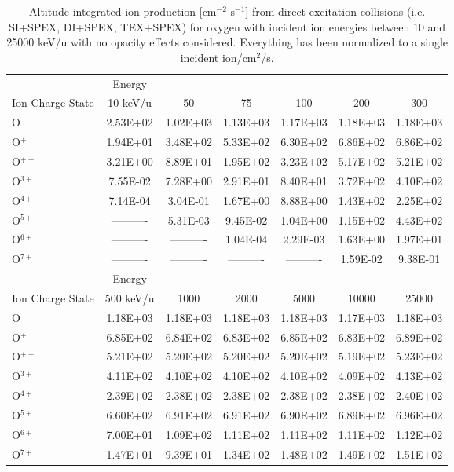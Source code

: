 \begin{table}[ht]
    \centering
    \caption{Altitude integrated ion production [cm$^{-2}$ s$^{-1}$] from direct excitation collisions (i.e. SI+SPEX, DI+SPEX, TEX+SPEX) for oxygen with incident ion energies between 10 and 25000 keV/u with no opacity effects considered. Everything has been normalized to a single incident ion/cm$^2$/s.}
    \begin{tabular}{l|c|c|c|c|c|c}
    \hline
    & Energy & & & & & \\
    Ion Charge State & 10 keV/u & 50 & 75 & 100 & 200 & 300 \\
    \hline
    O & 2.53E+02 & 1.02E+03 & 1.13E+03 & 1.17E+03 & 1.18E+03 & 1.18E+03 \\
    O$^+$ & 1.94E+01 & 3.48E+02 & 5.33E+02 & 6.30E+02 & 6.86E+02 & 6.86E+02 \\
    O$^{++}$ & 3.21E+00 & 8.89E+01 & 1.95E+02 & 3.23E+02 & 5.17E+02 & 5.21E+02 \\
    O$^{3+}$ & 7.55E-02 & 7.28E+00 & 2.91E+01 & 8.40E+01 & 3.72E+02 & 4.10E+02 \\
    O$^{4+}$ & 7.14E-04 & 3.04E-01 & 1.67E+00 & 8.88E+00 & 1.43E+02 & 2.25E+02 \\
    O$^{5+}$ & ---------- & 5.31E-03 & 9.45E-02 & 1.04E+00 & 1.15E+02 & 4.43E+02 \\
    O$^{6+}$ & ---------- & ---------- & 1.04E-04 & 2.29E-03 & 1.63E+00 & 1.97E+01 \\
    O$^{7+}$ & ---------- & ---------- & ---------- & ---------- & 1.59E-02 & 9.38E-01 \\
    \hline
    \hline
    & Energy & & & & & \\
    Ion Charge State & 500 keV/u & 1000 & 2000 & 5000 & 10000 & 25000 \\
    \hline
    O & 1.18E+03 & 1.18E+03 & 1.18E+03 & 1.18E+03 & 1.17E+03 & 1.18E+03 \\
    O$^+$ & 6.85E+02 & 6.84E+02 & 6.83E+02 & 6.85E+02 & 6.83E+02 & 6.89E+02 \\
    O$^{++}$ & 5.21E+02 & 5.20E+02 & 5.20E+02 & 5.20E+02 & 5.19E+02 & 5.23E+02 \\
    O$^{3+}$ & 4.11E+02 & 4.10E+02 & 4.10E+02 & 4.10E+02 & 4.09E+02 & 4.13E+02 \\
    O$^{4+}$ & 2.39E+02 & 2.38E+02 & 2.38E+02 & 2.38E+02 & 2.38E+02 & 2.40E+02 \\
    O$^{5+}$ & 6.60E+02 & 6.91E+02 & 6.91E+02 & 6.90E+02 & 6.89E+02 & 6.96E+02 \\
    O$^{6+}$ & 7.00E+01 & 1.09E+02 & 1.11E+02 & 1.11E+02 & 1.11E+02 & 1.12E+02 \\
    O$^{7+}$ & 1.47E+01 & 9.39E+01 & 1.34E+02 & 1.48E+02 & 1.49E+02 & 1.51E+02 \\
    \hline
    \end{tabular}
    \label{tab:OxyDEProd}
\end{table}

